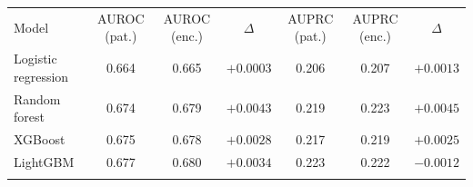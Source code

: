 \begin{tabular}{lcccccc}
\hline\noalign{\smallskip}
Model & AUROC (pat.) & AUROC (enc.) & $\Delta$ & AUPRC (pat.) & AUPRC (enc.) & $\Delta$ \\
\noalign{\smallskip}\hline\noalign{\smallskip}
Logistic regression & 0.664 & 0.665 & $+0.0003$ & 0.206 & 0.207 & $+0.0013$ \\
Random forest & 0.674 & 0.679 & $+0.0043$ & 0.219 & 0.223 & $+0.0045$ \\
XGBoost & 0.675 & 0.678 & $+0.0028$ & 0.217 & 0.219 & $+0.0025$ \\
LightGBM & 0.677 & 0.680 & $+0.0034$ & 0.223 & 0.222 & $-0.0012$ \\
\noalign{\smallskip}\hline
\end{tabular}
